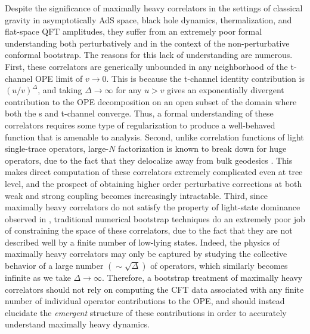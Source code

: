 \documentclass[a4paper,11pt]{article}
\theoremstyle{plain}
\theoremstyle{definition}
\theoremstyle{remark}
\newcommand{\De}{\Delta}
\begin{document}
Despite the significance of maximally heavy correlators in the settings of classical gravity in asymptotically AdS space, black hole dynamics, thermalization, and flat-space QFT amplitudes, they suffer from an extremely poor formal understanding both perturbatively and in the context of the non-perturbative conformal bootstrap. The reasons for this lack of understanding are numerous. First, these correlators are generically unbounded in any neighborhood of the t-channel OPE limit of $v \to 0$. This is because the t-channel identity contribution is $(u/v)^\De$, and taking $\De \to \infty$ for any $u >v$ gives an exponentially divergent contribution to the OPE decomposition on an open subset of the domain where both the s and t-channel converge. Thus, a formal understanding of these correlators requires some type of regularization to produce a well-behaved function that is amenable to analysis. Second, unlike correlation functions of light single-trace operators, large-$N$ factorization is known to break down for huge operators, due to the fact that they delocalize away from bulk geodesics \cite{Abajian2023-xw,Abajian:2023bqv,Lin:2004nb}. This makes direct computation of these correlators extremely complicated even at tree level, and the prospect of obtaining higher order perturbative corrections at both weak and strong coupling becomes increasingly intractable. Third, since maximally heavy correlators do not satisfy the property of light-state dominance observed in \cite{Kraus:2018pax}, traditional numerical bootstrap techniques do an extremely poor job of constraining the space of these correlators, due to the fact that they are not described well by a finite number of low-lying states. Indeed, the physics of maximally heavy correlators may only be captured by studying the collective behavior of a large number $(\sim\sqrt{\De})$ of operators, which similarly becomes infinite as we take $\De \to \infty$. Therefore, a bootstrap treatment of maximally heavy correlators should not rely on computing the CFT data associated with any finite number of individual operator contributions to the OPE, and should instead elucidate the \textit{emergent} structure of these contributions in order to accurately understand maximally heavy dynamics. 
\end{document}
